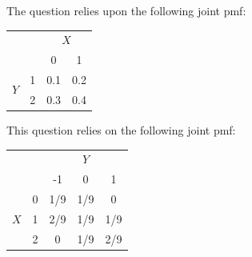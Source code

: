 \documentclass[addpoints,12pt]{exam}
\begin{document}
\begin{questions}
\question The question relies upon the following joint pmf: 
			\begin{center}
\begin{tabular}{|cc|cc|}
\hline
&&\multicolumn{2}{c|}{$X$}\\
&&0 & 1\\
\hline
\multirow{2}{*}{$Y$}
&1& \multicolumn{1}{|c}{0.1} & 0.2\\
&2& \multicolumn{1}{|c}{0.3} & 0.4\\
\hline
\end{tabular}
\end{center}


\question This question relies on the following joint pmf:
  \begin{center}
\begin{tabular}{|cc|ccc|}
\hline
&&\multicolumn{3}{c|}{$Y$}\\
&&-1 & 0 & 1\\
\hline
\multirow{4}{*}{$X$}
&0& \multicolumn{1}{|c}{1/9} & 1/9& 0\\
&1& \multicolumn{1}{|c}{2/9} & 1/9& 1/9\\
&2& \multicolumn{1}{|c}{0} & 1/9& 2/9\\
\hline
\end{tabular}
\end{center}
\begin{parts}

\end{parts}
\end{questions}
\end{document}
